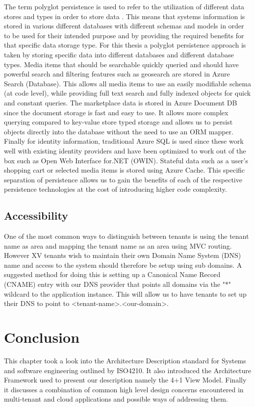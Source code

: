 The term polyglot persistence is used to refer to the utilization of different data stores and types in order to store data \cite{Sadalage2012-zw}. This means that systems information is stored in various different databases with different schemas and models in order to be used for their intended purpose and by providing the required benefits for that specific data storage type. For this thesis a polyglot persistence approach is taken by storing specific data into different databases and different database types. Media items that should be searchable quickly queried and should have powerful search and filtering features such as geosearch are stored in Azure Search (Database). This allows all media items to use an easily modifiable schema (at code level), while providing full text search and fully indexed objects for quick and constant queries. The marketplace data is stored in Azure Document DB since the document storage is fast and easy to use. It allows more complex querying compared to key-value store typed storage and allows us to persist objects directly into the database without the need to use an ORM mapper. Finally for identity information, traditional Azure SQL is used since these work well with existing identity providers and have been optimized to work out of the box such as Open Web Interface for.NET (OWIN). Stateful data such as a user's shopping cart or selected media items is stored using Azure Cache. This specific separation of persistence allows us to gain the benefits of each of the respective persistence technologies at the cost of introducing higher code complexity.


\subsection{Accessibility}

One of the most common ways to distinguish between tenants is using the tenant name as area and mapping the tenant name as an area using MVC routing. However XV tenants wish to maintain their own Domain Name System (DNS) name and access to the system should therefore be setup using sub domains. A suggested method for doing this is setting up a Canonical Name Record (CNAME) entry with our DNS provider that points all domains via the "*" wildcard to the application instance. This will allow us to have tenants to set up their DNS to point to <tenant-name>.<our-domain>.


\section{Conclusion}
This chapter took a look into the Architecture Description standard for Systems and software engineering outlined by ISO4210. It also introduced the Architecture Framework used to present our description namely the 4+1 View Model. Finally it discusses a combination of common high level design concerns encountered in multi-tenant and cloud applications and possible ways of addressing them. 